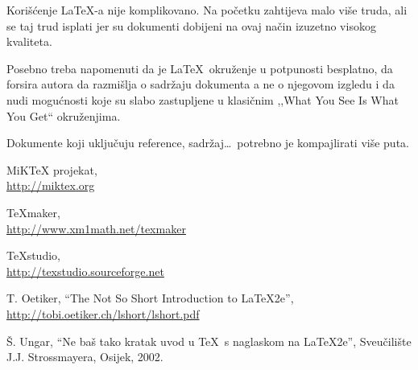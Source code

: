 \documentclass[12pt]{SeminarskiADS}
\begin{document}
Korišćenje \LaTeX-a nije komplikovano. Na početku zahtijeva malo više truda, ali se taj trud isplati jer su dokumenti dobijeni na ovaj način izuzetno visokog kvaliteta.

Posebno treba napomenuti da je \LaTeX\ okruženje u potpunosti besplatno, da forsira autora da razmišlja o sadržaju dokumenta a ne o njegovom izgledu i da nudi mogućnosti koje su slabo zastupljene u klasičnim ,,What You See Is What You Get`` okruženjima.

Dokumente koji uključuju reference, sadržaj\dots\ potrebno je kompajlirati više puta.

\clearpage
\begin{thebibliography}{99}
 MiKTeX projekat,\\
\url{http://miktex.org}

 TeXmaker,\\
\url{http://www.xm1math.net/texmaker}

 TeXstudio,\\
\url{http://texstudio.sourceforge.net}

 T. Oetiker, ``The Not So Short Introduction to \LaTeX2e'',\\ 
\url{http://tobi.oetiker.ch/lshort/lshort.pdf}

 Š. Ungar, ``Ne baš tako kratak uvod u \TeX\ s naglaskom na \LaTeX2e'', 
Sveučilište J.J. Strossmayera, Osijek, 2002.
\end{thebibliography}
\end{document}
